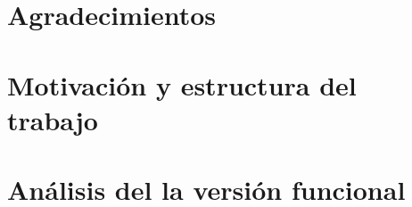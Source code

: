 \documentclass{book}
\begin{document}
\thispagestyle{empty}
\frontmatter
    
    \clearpage
    \mbox{}
    \clearpage
    \thispagestyle{empty}
    
    
    
    \chapter*{Agradecimientos}
    
    \clearpage
    
    \tableofcontents


\mainmatter
    \chapter*{Motivación y estructura del trabajo}
        
    
    
    
    
    \chapter{Análisis del la versión funcional}
        
    
    



\backmatter
    \nocite{*}
    \printbibliography
\end{document}
